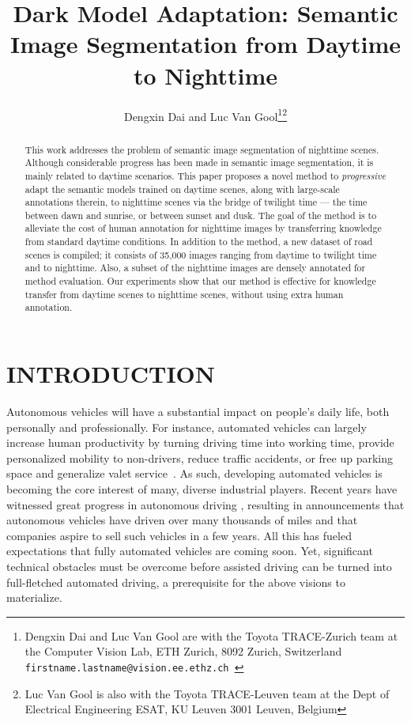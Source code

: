 \documentclass[letterpaper, 10 pt, conference]{ieeeconf}
\title{\LARGE \bf
Dark Model Adaptation: Semantic Image Segmentation from Daytime to Nighttime
}
\author{Dengxin Dai and Luc Van Gool\thanks{Dengxin Dai and Luc Van Gool are with the Toyota TRACE-Zurich team at the Computer Vision Lab, 
        ETH Zurich, 8092 Zurich, Switzerland
        {\tt\small firstname.lastname@vision.ee.ethz.ch }}\thanks{Luc Van Gool is also with the Toyota TRACE-Leuven team at the Dept of Electrical Engineering ESAT, KU Leuven
         3001 Leuven, Belgium}}
\begin{document}
\maketitle
\thispagestyle{empty}
\pagestyle{empty}

\begin{abstract}
This work addresses the problem of semantic image segmentation of nighttime scenes. Although considerable progress has been made in semantic image segmentation, it is mainly related to daytime scenarios. This paper proposes a novel method to \emph{progressive} adapt the semantic models trained on daytime scenes, along with large-scale annotations therein, to nighttime scenes via the bridge of twilight time --- the time between dawn and sunrise, or between sunset and dusk. The goal of the method is to alleviate the cost of human annotation for nighttime images by transferring knowledge from standard daytime conditions. In addition to the method, a new dataset of road scenes is compiled; it consists of 35,000 images ranging from daytime to twilight time and to nighttime. Also, a subset of the nighttime images are densely annotated for method evaluation. Our experiments show that our method is effective for knowledge transfer from daytime scenes to nighttime scenes, without using extra human annotation. 
\end{abstract}

\section{INTRODUCTION}
Autonomous vehicles will have a substantial impact on people's daily life, both personally and professionally. For instance, automated vehicles can largely increase human productivity by turning driving time into working time, provide personalized mobility to non-drivers, reduce traffic accidents, or free up parking space and generalize valet service~\cite{autonomous:vehicle:guide:policymakers}. As such, developing automated vehicles is becoming the core interest of many, diverse industrial players. Recent years have witnessed great progress in autonomous driving \cite{drive:surroundview:route:planner}, resulting in announcements that autonomous vehicles have driven over many thousands of miles and that companies aspire to sell such vehicles in a few years. All this has fueled expectations that fully automated vehicles are coming soon. Yet, significant technical obstacles must be overcome before assisted driving can be turned into full-fletched automated driving, a prerequisite for the above visions to materialize.
\end{document}
